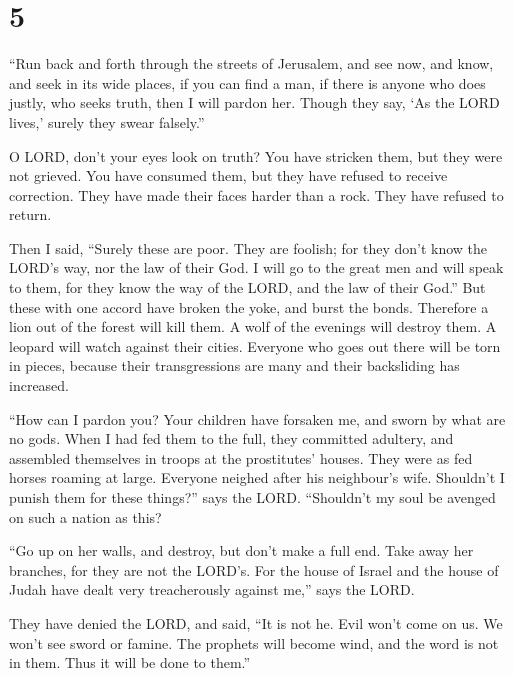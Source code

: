 \hypertarget{section-4}{%
\section{5}\label{section-4}}

 ``Run back and forth through the streets of Jerusalem,
and see now, and know, and seek in its wide places, if you can find a
man, if there is anyone who does justly, who seeks truth, then I will
pardon her.  Though they say, `As the LORD lives,' surely
they swear falsely.''

 O LORD, don't your eyes look on truth? You have stricken
them, but they were not grieved. You have consumed them, but they have
refused to receive correction. They have made their faces harder than a
rock. They have refused to return.

 Then I said, ``Surely these are poor. They are foolish;
for they don't know the LORD's way, nor the law of their God.
 I will go to the great men and will speak to them, for
they know the way of the LORD, and the law of their God.'' But these
with one accord have broken the yoke, and burst the bonds.
 Therefore a lion out of the forest will kill them. A wolf
of the evenings will destroy them. A leopard will watch against their
cities. Everyone who goes out there will be torn in pieces, because
their transgressions are many and their backsliding has increased.

 ``How can I pardon you? Your children have forsaken me,
and sworn by what are no gods. When I had fed them to the full, they
committed adultery, and assembled themselves in troops at the
prostitutes' houses.  They were as fed horses roaming at
large. Everyone neighed after his neighbour's wife. 
Shouldn't I punish them for these things?'' says the LORD. ``Shouldn't
my soul be avenged on such a nation as this?

 ``Go up on her walls, and destroy, but don't make a full
end. Take away her branches, for they are not the LORD's.
 For the house of Israel and the house of Judah have
dealt very treacherously against me,'' says the LORD.

 They have denied the LORD, and said, ``It is not he.
Evil won't come on us. We won't see sword or famine.  The
prophets will become wind, and the word is not in them. Thus it will be
done to them.''

